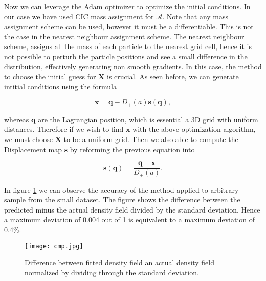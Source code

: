 Now we can leverage the Adam optimizer \citep{kingma2014adam} to optimize the initial conditions.
In our case we have used CIC mass assignment for $\mathcal{A}$. Note that any mass assignment scheme can be used, however it must be a differentiable. This is not the case in the nearest neighbour assignment scheme. The nearest neighbour scheme, assigns all the mass of each particle to the nearest grid cell, hence it is not possible to perturb the particle positions and see a small difference in the distribution, effectively generating non smooth gradients. In this case, the method to choose the initial guess for $\mathbf{X}$ is crucial. As seen before, we can generate intitial conditions using the formula

\begin{equation}
    \mathbf{x} = \mathbf{q} - D_{+}(a)\mathbf{s}(\mathbf{q}),
\end{equation}

whereas $\mathbf{q}$ are the Lagrangian position, which is essential a 3D grid with uniform distances. Therefore if we wish to find $\mathbf{x}$ with the above optimization algorithm, we must choose $\mathbf{X}$ to be a uniform grid. Then we also able to compute the Displacement map $\mathbf{s}$ by reforming the previous equation into

\begin{equation}
    \mathbf{s}(\mathbf{q}) = \frac{\mathbf{q} - \mathbf{x}}{D_{+}(a)}.
\end{equation}

In figure \ref{fig:field-fit} we can observe the accuracy of the method applied to arbitrary sample from the small dataset. The figure shows the difference between the predicted minus the actual density field divided by the standard deviation. Hence a maximum deviation of 0.004 out of 1 is equivalent to a maximum deviation of $0.4\%$.

\begin{figure}[h]
    \centering
    \texttt{[image: cmp.jpg]}
    \caption{Difference between fitted density field an actual density field normalized by dividing through the standard deviation.}
    \label{fig:field-fit}
\end{figure}

